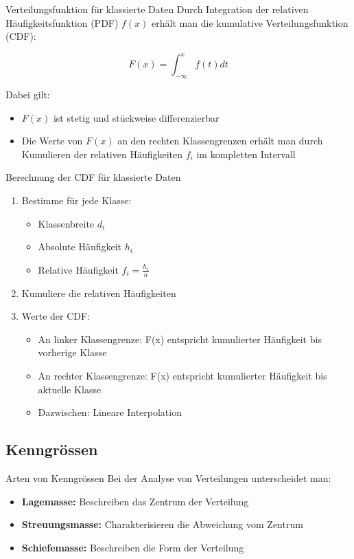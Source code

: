 \begin{definition}{Verteilungsfunktion für klassierte Daten}
Durch Integration der relativen Häufigkeitsfunktion (PDF) $f(x)$ erhält man die kumulative Verteilungsfunktion (CDF):

$$F(x) = \int_{-\infty}^x f(t)dt$$

Dabei gilt:
\begin{itemize}
    \item $F(x)$ ist stetig und stückweise differenzierbar
    \item Die Werte von $F(x)$ an den rechten Klassengrenzen erhält man durch Kumulieren der relativen Häufigkeiten $f_i$ im kompletten Intervall
\end{itemize}
\end{definition}

\begin{KR}{Berechnung der CDF für klassierte Daten}
\begin{enumerate}
    \item Bestimme für jede Klasse:
    \begin{itemize}
        \item Klassenbreite $d_i$
        \item Absolute Häufigkeit $h_i$
        \item Relative Häufigkeit $f_i = \frac{h_i}{n}$
    \end{itemize}
    \item Kumuliere die relativen Häufigkeiten
    \item Werte der CDF:
    \begin{itemize}
        \item An linker Klassengrenze: F(x) entspricht kumulierter Häufigkeit bis vorherige Klasse
        \item An rechter Klassengrenze: F(x) entspricht kumulierter Häufigkeit bis aktuelle Klasse
        \item Dazwischen: Lineare Interpolation
    \end{itemize}
\end{enumerate}
\end{KR}

\subsection{Kenngrössen}

\begin{concept}{Arten von Kenngrössen}
Bei der Analyse von Verteilungen unterscheidet man:
\begin{itemize}
    \item \textbf{Lagemasse:} Beschreiben das Zentrum der Verteilung
    \item \textbf{Streuungsmasse:} Charakterisieren die Abweichung vom Zentrum
    \item \textbf{Schiefemasse:} Beschreiben die Form der Verteilung
\end{itemize}
\end{concept}


